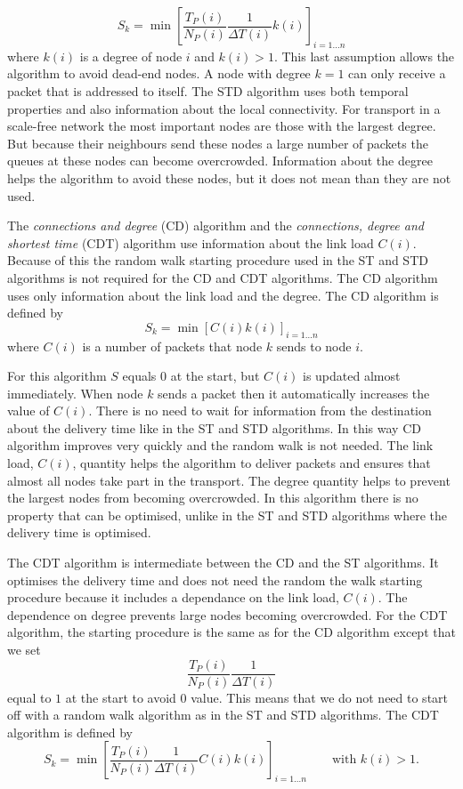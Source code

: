 \documentclass[runningheads]{llncs}
\begin{document}
\begin{equation}\label{STD}
  S_k=\min\left[\frac{T_P(i)}{N_P(i)}\frac{1}{\Delta
  T(i)}k(i)\right]_{i=1\ldots n}
\end{equation}
where $k(i)$ is a degree of node $i$ and $k(i)>1$. This last
assumption allows the algorithm to avoid dead-end nodes. A node with
degree $k=1$ can only receive a packet that is addressed to itself.
The STD algorithm uses both temporal properties and also information
about the local connectivity. For transport in a scale-free network
the most important nodes are those with the largest degree. But
because their neighbours send these nodes a large number of packets
the queues at these nodes can become overcrowded. Information about
the degree helps the algorithm to avoid these nodes, but it does not
mean than they are not used.

The \emph{connections and degree} (CD) algorithm and the
\emph{connections, degree and shortest time} (CDT) algorithm use
information about the link load $C(i)$. Because of this the random
walk starting procedure used in the ST and STD algorithms is not
required for the CD and CDT algorithms. The CD algorithm uses only
information about the link load and the degree. The CD algorithm is
defined by
\begin{equation}\label{CD}
  S_k=\min[C(i)k(i)]_{i=1\ldots n}
\end{equation}
where $C(i)$ is a number of packets that node $k$ sends to node
$i$.

For this algorithm $S$ equals $0$ at the start, but $C(i)$ is
updated almost immediately. When node $k$ sends a packet then it
automatically increases the value of $C(i)$. There is no need to
wait for information from the destination about the delivery time
like in the ST and STD algorithms. In this way CD algorithm improves
very quickly and the random walk is not needed. The link load,
$C(i)$, quantity helps the algorithm to deliver packets and ensures
that almost all nodes take part in the transport. The degree
quantity helps to prevent the largest nodes from becoming
overcrowded. In this algorithm there is no property that can be
optimised, unlike in the ST and STD algorithms where the delivery
time is optimised.

The CDT algorithm is intermediate between the CD and the ST
algorithms. It optimises the delivery time and does not need the
random the walk starting procedure because it includes a dependance
on the link load, $C(i)$. The dependence on degree prevents large
nodes becoming overcrowded. For the CDT algorithm, the starting
procedure is the same as for the CD algorithm except that we set
\begin{equation}\label{TimeElem}
  \frac{T_P(i)}{N_P(i)}\frac{1}{\Delta
  T(i)}
\end{equation}
equal to $1$ at the start to avoid $0$ value. This means that we do not
need to start off with a random walk algorithm as in the ST and STD algorithms.
The CDT algorithm is defined by
\begin{equation}\label{CDT}
  S_k=\min\left[\frac{T_P(i)}{N_P(i)}\frac{1}{\Delta
  T(i)}C(i)k(i)\right]_{i=1\ldots n}\qquad\mbox{with }k(i)>1.
\end{equation}
\end{document}
